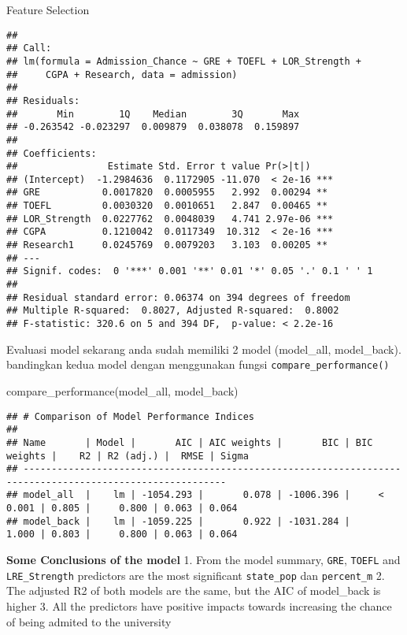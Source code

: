 \documentclass[
  ignorenonframetext,
]{beamer}
\newenvironment{Shaded}{\begin{snugshade}}{\end{snugshade}}
\newcommand{\FunctionTok}[1]{\textcolor[rgb]{0.00,0.00,0.00}{#1}}
\newcommand{\NormalTok}[1]{#1}
\begin{document}
\begin{frame}[fragile]{Feature Selection}
\begin{verbatim}
## 
## Call:
## lm(formula = Admission_Chance ~ GRE + TOEFL + LOR_Strength + 
##     CGPA + Research, data = admission)
## 
## Residuals:
##       Min        1Q    Median        3Q       Max 
## -0.263542 -0.023297  0.009879  0.038078  0.159897 
## 
## Coefficients:
##                Estimate Std. Error t value Pr(>|t|)    
## (Intercept)  -1.2984636  0.1172905 -11.070  < 2e-16 ***
## GRE           0.0017820  0.0005955   2.992  0.00294 ** 
## TOEFL         0.0030320  0.0010651   2.847  0.00465 ** 
## LOR_Strength  0.0227762  0.0048039   4.741 2.97e-06 ***
## CGPA          0.1210042  0.0117349  10.312  < 2e-16 ***
## Research1     0.0245769  0.0079203   3.103  0.00205 ** 
## ---
## Signif. codes:  0 '***' 0.001 '**' 0.01 '*' 0.05 '.' 0.1 ' ' 1
## 
## Residual standard error: 0.06374 on 394 degrees of freedom
## Multiple R-squared:  0.8027, Adjusted R-squared:  0.8002 
## F-statistic: 320.6 on 5 and 394 DF,  p-value: < 2.2e-16
\end{verbatim}
\end{frame}

\begin{frame}[fragile]{Evaluasi model}
\protect\hypertarget{evaluasi-model}{}
sekarang anda sudah memiliki 2 model (model\_all, model\_back).
bandingkan kedua model dengan menggunakan fungsi
\texttt{compare\_performance()}

\begin{Shaded}
\begin{Highlighting}[]
\FunctionTok{compare\_performance}\NormalTok{(model\_all, model\_back)}
\end{Highlighting}
\end{Shaded}

\begin{verbatim}
## # Comparison of Model Performance Indices
## 
## Name       | Model |       AIC | AIC weights |       BIC | BIC weights |    R2 | R2 (adj.) |  RMSE | Sigma
## ----------------------------------------------------------------------------------------------------------
## model_all  |    lm | -1054.293 |       0.078 | -1006.396 |     < 0.001 | 0.805 |     0.800 | 0.063 | 0.064
## model_back |    lm | -1059.225 |       0.922 | -1031.284 |       1.000 | 0.803 |     0.800 | 0.063 | 0.064
\end{verbatim}

\textbf{Some Conclusions of the model} 1. From the model summary,
\texttt{GRE}, \texttt{TOEFL} and \texttt{LRE\_Strength} predictors are
the most significant \texttt{state\_pop} dan \texttt{percent\_m} 2. The
adjusted R2 of both models are the same, but the AIC of model\_back is
higher 3. All the predictors have positive impacts towards increasing
the chance of being admited to the university
\end{frame}
\end{document}
